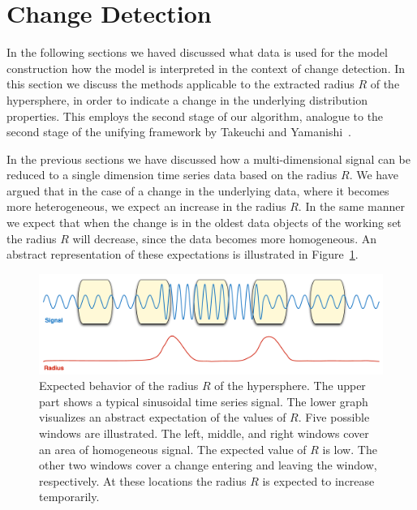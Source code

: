 \section{Change Detection}\label{sec:method_change_detection}
In the following sections we haved discussed what data is used for the model construction how the model is interpreted in the context of change detection.
In this section we discuss the methods applicable to the extracted radius $R$ of the hypersphere, in order to indicate a change in the underlying distribution properties.
This employs the second stage of our algorithm, analogue to the second stage of the unifying framework by Takeuchi and Yamanishi~\cite{takeuchi2006unifying}.

In the previous sections we have discussed how a multi-dimensional signal can be reduced to a single dimension time series data based on the radius $R$.
We have argued that in the case of a change in the underlying data, where it becomes more heterogeneous, we expect an increase in the radius $R$.
In the same manner we expect that when the change is in the oldest data objects of the working set the radius $R$ will decrease, since the data becomes more homogeneous.
An abstract representation of these expectations is illustrated in Figure~\ref{fig:radius_expectation}.

\begin{figure}
  \centering
    \includegraphics[width=\textwidth,height=\textheight,keepaspectratio]{./Figures/chapter4/expected_behaviour.pdf}
  \caption[Expected radius behavior]{Expected behavior of the radius $R$ of the hypersphere. The upper part shows a typical sinusoidal time series signal. The lower graph visualizes an abstract expectation of the values of $R$. Five possible windows are illustrated. The left, middle, and right windows cover an area of homogeneous signal. The expected value of $R$ is low. The other two windows cover a change entering and leaving the window, respectively. At these locations the radius $R$ is expected to increase temporarily.}
  \label{fig:radius_expectation}
\end{figure}

